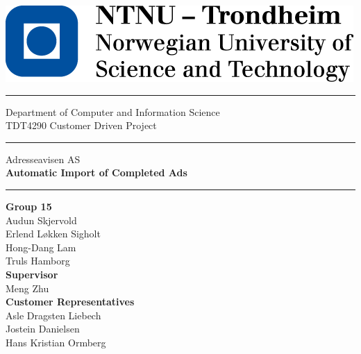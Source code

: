 \begin{titlepage}
\begin{center}

\includegraphics{images/ntnulogo} \\ 
\vspace{0.5cm}
\hrule \vspace{0.5cm}
\Large{Department of Computer and Information Science} \\
\Large{TDT4290 Customer Driven Project} \\
\vspace{0.5cm}
\hrule \vspace{2cm}
\Large{Adresseavisen AS} \\
{\Large \textbf{Automatic Import of Completed Ads}} \\

\vspace{3cm}

	\hrule \vspace{0.5cm}
	\textbf{Group 15} \\
	Audun Skjervold \\ 
	Erlend Løkken Sigholt \\ 
	Hong-Dang Lam \\ 
	Truls Hamborg \\
	\vspace{0.5cm}
	\textbf{Supervisor}\\ 
	Meng Zhu\\
	\vspace{0.5cm}
	\textbf{Customer Representatives}\\ 
	Asle Dragsten Liebech \\
	Jostein Danielsen\\
	Hans Kristian Ormberg\\


\end{center}
\end{titlepage}